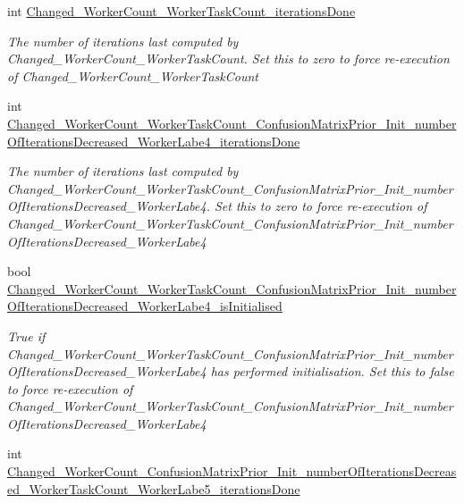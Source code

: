\begin{DoxyCompactItemize}
int \hyperlink{class_microsoft_research_1_1_infer_1_1_models_1_1_user_1_1_model___e_p_aa1a7d6b28fd11a566a03df6b6c06ddcb}{Changed\+\_\+\+Worker\+Count\+\_\+\+Worker\+Task\+Count\+\_\+iterations\+Done}
\begin{DoxyCompactList}\small\item\em The number of iterations last computed by Changed\+\_\+\+Worker\+Count\+\_\+\+Worker\+Task\+Count. Set this to zero to force re-\/execution of Changed\+\_\+\+Worker\+Count\+\_\+\+Worker\+Task\+Count\end{DoxyCompactList}\item 
int \hyperlink{class_microsoft_research_1_1_infer_1_1_models_1_1_user_1_1_model___e_p_a5bf8aef1624310fee144a221a1108716}{Changed\+\_\+\+Worker\+Count\+\_\+\+Worker\+Task\+Count\+\_\+\+Confusion\+Matrix\+Prior\+\_\+\+Init\+\_\+number\+Of\+Iterations\+Decreased\+\_\+\+Worker\+Labe4\+\_\+iterations\+Done}
\begin{DoxyCompactList}\small\item\em The number of iterations last computed by Changed\+\_\+\+Worker\+Count\+\_\+\+Worker\+Task\+Count\+\_\+\+Confusion\+Matrix\+Prior\+\_\+\+Init\+\_\+number\+Of\+Iterations\+Decreased\+\_\+\+Worker\+Labe4. Set this to zero to force re-\/execution of Changed\+\_\+\+Worker\+Count\+\_\+\+Worker\+Task\+Count\+\_\+\+Confusion\+Matrix\+Prior\+\_\+\+Init\+\_\+number\+Of\+Iterations\+Decreased\+\_\+\+Worker\+Labe4\end{DoxyCompactList}\item 
bool \hyperlink{class_microsoft_research_1_1_infer_1_1_models_1_1_user_1_1_model___e_p_ae305ba92155c72ca215b3948d87dd321}{Changed\+\_\+\+Worker\+Count\+\_\+\+Worker\+Task\+Count\+\_\+\+Confusion\+Matrix\+Prior\+\_\+\+Init\+\_\+number\+Of\+Iterations\+Decreased\+\_\+\+Worker\+Labe4\+\_\+is\+Initialised}
\begin{DoxyCompactList}\small\item\em True if Changed\+\_\+\+Worker\+Count\+\_\+\+Worker\+Task\+Count\+\_\+\+Confusion\+Matrix\+Prior\+\_\+\+Init\+\_\+number\+Of\+Iterations\+Decreased\+\_\+\+Worker\+Labe4 has performed initialisation. Set this to false to force re-\/execution of Changed\+\_\+\+Worker\+Count\+\_\+\+Worker\+Task\+Count\+\_\+\+Confusion\+Matrix\+Prior\+\_\+\+Init\+\_\+number\+Of\+Iterations\+Decreased\+\_\+\+Worker\+Labe4\end{DoxyCompactList}\item 
int \hyperlink{class_microsoft_research_1_1_infer_1_1_models_1_1_user_1_1_model___e_p_a90f97411af644a567896bd38068a3681}{Changed\+\_\+\+Worker\+Count\+\_\+\+Confusion\+Matrix\+Prior\+\_\+\+Init\+\_\+number\+Of\+Iterations\+Decreased\+\_\+\+Worker\+Task\+Count\+\_\+\+Worker\+Labe5\+\_\+iterations\+Done}

\end{DoxyCompactItemize}
